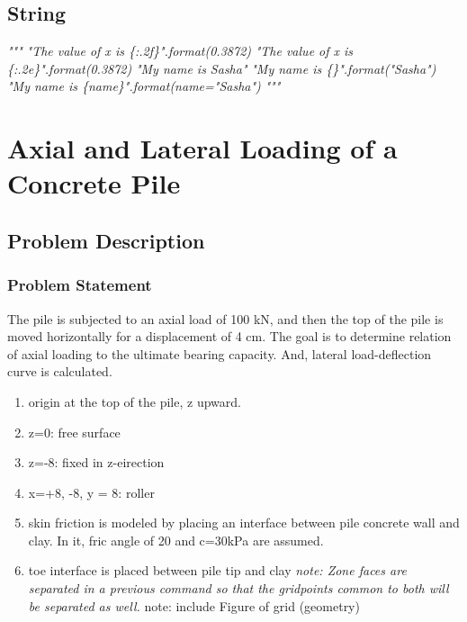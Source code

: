 \documentclass[a4paper, nobind]{templates/ociamthesis}
\providecommand{\tightlist}{%
  \setlength{\itemsep}{0pt}\setlength{\parskip}{0pt}}
\newenvironment{Shaded}{\begin{snugshade}}{\end{snugshade}}
\newcommand{\CommentTok}[1]{\textcolor[rgb]{0.56,0.35,0.01}{\textit{#1}}}
\renewenvironment{Shaded}
{
  \vspace{10pt}%
  \begin{snugshade}%
}{%
  \end{snugshade}%
  \vspace{8pt}%
}
\begin{document}
\hypertarget{string}{%
\section{String}\label{string}}

\begin{Shaded}
\begin{Highlighting}[]
\CommentTok{"""}
\CommentTok{"The value of x is \{:.2f\}".format(0.3872)}
\CommentTok{"The value of x is \{:.2e\}".format(0.3872)}
\CommentTok{"My name is Sasha"}
\CommentTok{"My name is \{\}".format("Sasha")}
\CommentTok{"My name is \{name\}".format(name="Sasha")}
\CommentTok{"""}
\end{Highlighting}
\end{Shaded}

\newpage

\hypertarget{axial-and-lateral-loading-of-a-concrete-pile}{%
\chapter{Axial and Lateral Loading of a Concrete Pile}\label{axial-and-lateral-loading-of-a-concrete-pile}}

\hypertarget{problem-description}{%
\section{Problem Description}\label{problem-description}}

\hypertarget{problem-statement}{%
\subsection{Problem Statement}\label{problem-statement}}

The pile is subjected to an axial load of 100 kN,
and then the top of the pile is moved horizontally for a displacement of 4 cm.
The goal is to determine relation of axial loading to the ultimate bearing capacity.
And, lateral load-deflection curve is calculated.

\begin{enumerate}
\def\labelenumi{\arabic{enumi})}
\tightlist
\item
  origin at the top of the pile, z upward.
\item
  z=0: free surface
\item
  z=-8: fixed in z-eirection
\item
  x=+8, -8, y = 8: roller
\item
  skin friction is modeled by placing an interface
  between pile concrete wall and clay.
  In it, fric angle of 20 and c=30kPa are assumed.
\item
  toe interface is placed between pile tip and clay
  \emph{note: Zone faces are separated in a previous command so that the gridpoints common to both will be separated as well.
  }note: include Figure of grid (geometry)
\end{enumerate}
\end{document}
